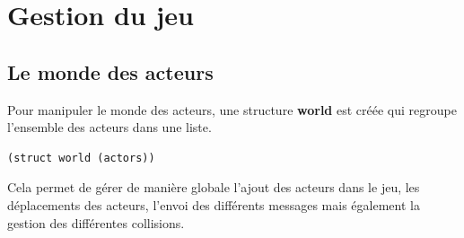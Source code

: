 \section{Gestion du jeu}

\subsection{Le monde des acteurs}

Pour manipuler le monde des acteurs, une structure \textbf{world} est créée qui regroupe l'ensemble des acteurs dans une liste.
\begin{lstlisting}[language={lisp},captionpos=b, frame=single]
(struct world (actors))
\end{lstlisting}
Cela permet de gérer de manière globale l'ajout des acteurs dans le jeu, les déplacements des acteurs, l'envoi des différents messages mais également la gestion des différentes collisions. \\

